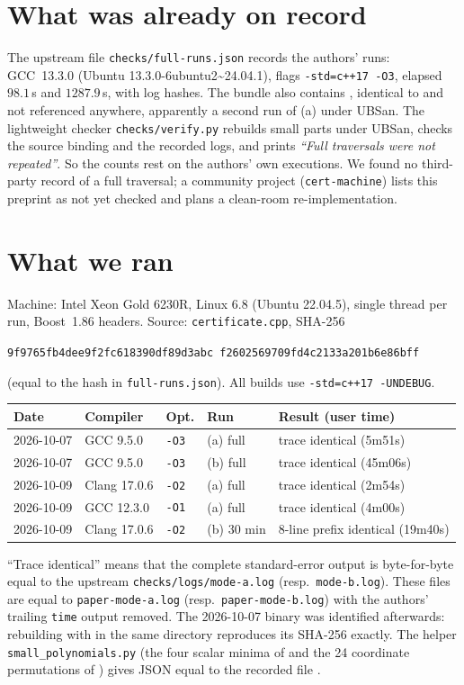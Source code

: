 \documentclass[11pt]{amsart}
\begin{document}
\section{What was already on record}
The upstream file \texttt{checks/full-runs.json} records the authors' runs: GCC~13.3.0 (Ubuntu
13.3.0-6ubuntu2\textasciitilde24.04.1), flags \texttt{-std=c++17 -O3}, elapsed $98.1$\,s and
$1287.9$\,s, with log hashes. The bundle also contains , identical to
 and not referenced anywhere, apparently a second run of (a) under UBSan. The lightweight checker \texttt{checks/verify.py} rebuilds small parts
under UBSan, checks the source binding and the recorded logs, and prints \emph{``Full traversals were
not repeated''}. So the counts rest on the authors' own executions. We found no third-party record
of a full traversal; a community project (\texttt{cert-machine}) lists this preprint as not yet checked
and plans a clean-room re-implementation.

\section{What we ran}
Machine: Intel Xeon Gold 6230R, Linux 6.8 (Ubuntu 22.04.5), single thread per run, Boost~1.86
headers. Source: \texttt{certificate.cpp}, SHA-256
\begin{center}\texttt{9f9765fb4dee9f2fc618390df89d3abc\,f2602569709fd4c2133a201b6e86bff}\end{center}
(equal to the hash in \texttt{full-runs.json}). All builds use \texttt{-std=c++17 -UNDEBUG}.
\begin{center}
\small
\begin{tabular}{lllll}
\toprule
Date & Compiler & Opt. & Run & Result (user time)\\
\midrule
2026-10-07 & GCC 9.5.0 & \texttt{-O3} & (a) full & trace identical (5m51s)\\
2026-10-07 & GCC 9.5.0 & \texttt{-O3} & (b) full & trace identical (45m06s)\\
2026-10-09 & Clang 17.0.6 & \texttt{-O2} & (a) full & trace identical (2m54s)\\
2026-10-09 & GCC 12.3.0 & \texttt{-O1} & (a) full & trace identical (4m00s)\\
2026-10-09 & Clang 17.0.6 & \texttt{-O2} & (b) 30 min & 8-line prefix identical (19m40s)\\
\bottomrule
\end{tabular}
\end{center}
``Trace identical'' means that the complete standard-error output is byte-for-byte equal to the
upstream \texttt{checks/logs/mode-a.log} (resp.\ \texttt{mode-b.log}). These files are equal to
\texttt{paper-mode-a.log} (resp.\ \texttt{paper-mode-b.log}) with the authors' trailing
\texttt{time} output removed. The 2026-10-07 binary was identified afterwards: rebuilding with
 in the same directory reproduces its
SHA-256 exactly. The helper \texttt{small\_polynomials.py} (the four scalar minima of \cite[Lemma~5.1]{oai} and the
24 coordinate permutations of \cite[Section~5]{oai}) gives JSON equal to the recorded file
.
\end{document}
